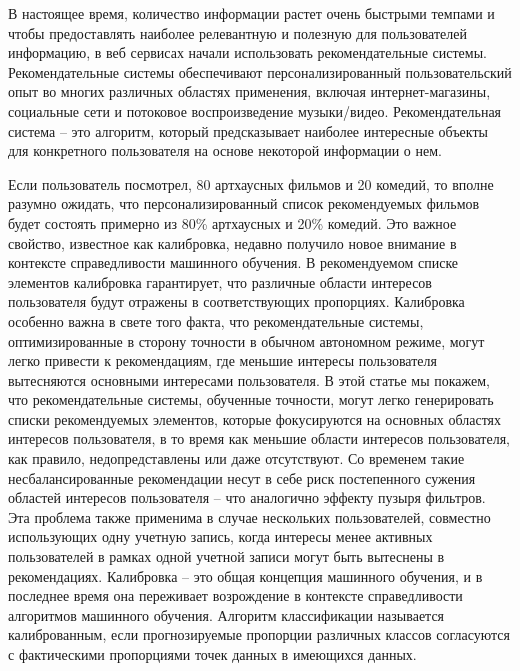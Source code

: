 \documentclass[a4paper,article,14pt]{extarticle}
\begin{document}




В настоящее время, количество информации растет очень быстрыми темпами и чтобы предоставлять наиболее релевантную и полезную для пользователей информацию, 
в веб сервисах начали использовать рекомендательные системы.  Рекомендательные системы обеспечивают персонализированный пользовательский опыт во многих различных областях применения, включая интернет-магазины, социальные сети и потоковое воспроизведение музыки/видео.  
Рекомендательная система -- это алгоритм, который предсказывает наиболее интересные
 объекты для конкретного пользователя на основе некоторой информации о нем.

 Если пользователь посмотрел, 80 артхаусных фильмов и 20 комедий, то вполне разумно ожидать, что персонализированный список рекомендуемых фильмов будет состоять примерно из 80\% артхаусных и 20\% комедий. Это важное свойство, известное как калибровка, недавно получило новое внимание в контексте справедливости машинного обучения. В рекомендуемом списке элементов калибровка гарантирует, что различные области интересов пользователя будут отражены в соответствующих пропорциях. Калибровка особенно важна в свете того факта, что рекомендательные системы, оптимизированные в сторону точности
  в обычном автономном режиме, могут легко привести к рекомендациям, где меньшие интересы пользователя вытесняются основными интересами пользователя.
 В этой статье мы покажем, что рекомендательные системы, обученные точности, могут легко генерировать списки рекомендуемых элементов, которые фокусируются на основных областях интересов пользователя, в то время как меньшие области интересов пользователя, как правило, недопредставлены или даже отсутствуют. 
 Со временем такие несбалансированные рекомендации несут в себе риск постепенного сужения областей интересов пользователя -- что аналогично эффекту пузыря фильтров. Эта проблема также применима в случае нескольких пользователей, совместно использующих одну учетную запись, когда интересы менее активных пользователей в рамках одной учетной записи могут быть вытеснены в рекомендациях.
 Калибровка -- это общая концепция машинного обучения, и в последнее время она переживает возрождение в контексте справедливости алгоритмов машинного обучения. Алгоритм классификации называется калиброванным, если прогнозируемые пропорции различных классов согласуются с фактическими пропорциями точек данных в имеющихся данных. 

\end{document}
